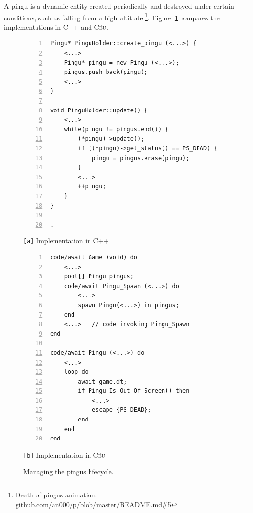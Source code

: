 \documentclass{vgtc}                          %
\newcommand{\CEU}{\textsc{C\'{e}u}\xspace}
\newcommand{\code}[1] {{\small{\texttt{#1}}}}
\newcommand{\ax}{\code{[a]}\xspace}
\newcommand{\bx}{\code{[b]}\xspace}
\begin{document}

A pingu is a dynamic entity created periodically and destroyed under certain
conditions, such as falling from a high altitude%
\footnote{Death of pingus animation: \url{github.com/an000/p/blob/master/README.md#5} }.
%
Figure~\ref{lst.pingus} compares the implementations in C++ and \CEU.

\begin{figure}[t]
\begin{minipage}[t]{0.50\linewidth}
\begin{lstlisting}[numbers=left,xleftmargin=3em]
Pingu* PinguHolder::create_pingu (<...>) {
    <...>
    Pingu* pingu = new Pingu (<...>);
    pingus.push_back(pingu);
    <...>
}

void PinguHolder::update() {
    <...>
    while(pingu != pingus.end()) {
        (*pingu)->update();
        if ((*pingu)->get_status() == PS_DEAD) {
            pingu = pingus.erase(pingu);
        }
        <...>
        ++pingu;
    }
}

.
\end{lstlisting}
\centering\small{\ax Implementation in C++}
\end{minipage}
%
\begin{minipage}[t]{0.50\linewidth}
\begin{lstlisting}[numbers=left,xleftmargin=3em]
code/await Game (void) do
    <...>
    pool[] Pingu pingus;
    code/await Pingu_Spawn (<...>) do
        <...>
        spawn Pingu(<...>) in pingus;
    end
    <...>   // code invoking Pingu_Spawn
end

code/await Pingu (<...>) do
    <...>
    loop do
        await game.dt;
        if Pingu_Is_Out_Of_Screen() then
            <...>
            escape {PS_DEAD};
        end
    end
end
\end{lstlisting}
\centering\small{\bx Implementation in \CEU}
\end{minipage}
\caption{ Managing the pingus lifecycle.
\label{lst.pingus}
}
\end{figure}
\end{document}

